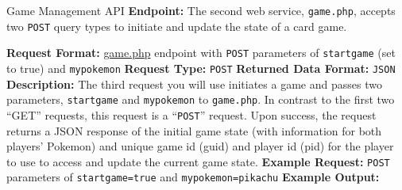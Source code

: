 \documentclass[programming]{../../../../mfcs}
\begin{document}
\begin{question}{Game Management API}
\textbf{Endpoint:} \texttt{\textbf{\color{colour}{https://webster.cs.washington.edu/pokedex/game.php}}}
\newline
  The second web service, \texttt{game.php}, accepts two \texttt{POST} query types to initiate and
  update the state of a card game. 
\newline

  \textbf{Request Format:} \url{game.php} endpoint with \texttt{POST} parameters of
  \texttt{startgame} (set to true) and \texttt{mypokemon}
  \newline
  \textbf{Request Type:} \texttt{POST}
  \newline
  \textbf{Returned Data Format:} \texttt{JSON}
  \newline
  \textbf{Description:} The third request you will use initiates a game and passes two parameters,
  \texttt{startgame} and \texttt{mypokemon} to \texttt{game.php}. In contrast to the
  first two ``GET'' requests, this request is a ``\texttt{POST}'' request. Upon success, the request returns
  a JSON response of the initial game state (with information for both players' Pokemon) and unique game id (guid) and player id (pid) for the player to use to access and update the current game
state. 
\newline
\textbf{Example Request:}
\newline
\texttt{POST} parameters of \texttt{startgame=true} and \texttt{mypokemon=pikachu}
\newline
\textbf{Example Output:}
\newline


\end{question}
\end{document}
